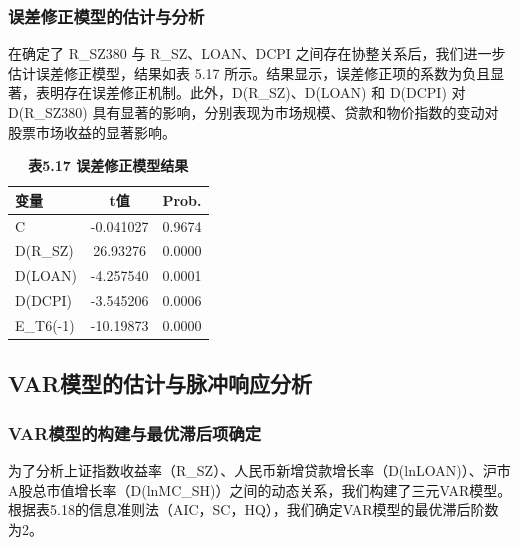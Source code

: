 \documentclass[12pt, a4paper]{article}
\numberwithin{equation}{section}
\begin{document}
\subsubsection{误差修正模型的估计与分析}

在确定了 R\_SZ380 与 R\_SZ、LOAN、DCPI 之间存在协整关系后，我们进一步估计误差修正模型，结果如表 5.17 所示。结果显示，误差修正项的系数为负且显著，表明存在误差修正机制。此外，D(R\_SZ)、D(LOAN) 和 D(DCPI) 对 D(R\_SZ380) 具有显著的影响，分别表现为市场规模、贷款和物价指数的变动对股票市场收益的显著影响。

\begin{table}[h!]
    \centering
    \captionsetup{labelformat=empty}
    \caption{\textbf{\fontsize{9pt}{11pt}\selectfont 表5.17 误差修正模型结果}}
    \begin{tabular}{lcc}
        \toprule
        变量        & t值        & Prob.  \\
        \midrule
        C         & -0.041027 & 0.9674 \\
        D(R\_SZ)  & 26.93276  & 0.0000 \\
        D(LOAN)   & -4.257540 & 0.0001 \\
        D(DCPI)   & -3.545206 & 0.0006 \\
        E\_T6(-1) & -10.19873 & 0.0000 \\
        \bottomrule
    \end{tabular}
\end{table}

\subsection{VAR模型的估计与脉冲响应分析}
\subsubsection{VAR模型的构建与最优滞后项确定}

为了分析上证指数收益率（R\_SZ）、人民币新增贷款增长率（D(lnLOAN)）、沪市A股总市值增长率（D(lnMC\_SH)）之间的动态关系，我们构建了三元VAR模型。根据表5.18的信息准则法（AIC，SC，HQ），我们确定VAR模型的最优滞后阶数为2。
\end{document}
